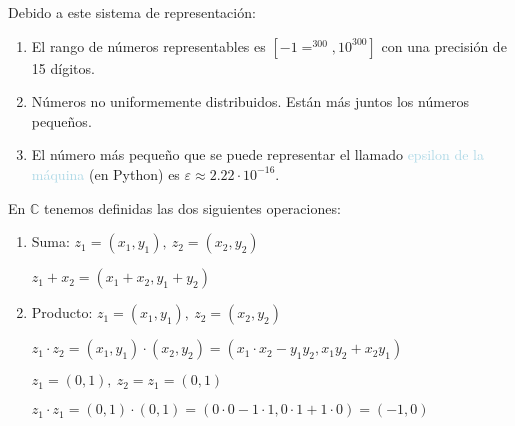 Debido a este sistema de representación:
\begin{enumerate}[label=\color{lightblue}\arabic*)]
	\item El rango de números representables es $[-1=^{300},10^{300}]$ con una precisión de 15 dígitos.
	\item Números no uniformemente distribuidos. Están más juntos los números pequeños.
	\item El número más pequeño que se puede representar el llamado \textcolor{lightblue}{epsilon de la máquina} (en Python) es $\varepsilon\approx2.22\cdot10^{-16}$.
\end{enumerate}
En $\mathbb{C}$ tenemos definidas las dos siguientes operaciones:
\begin{enumerate}[label=\color{lightblue}\alph*)]
	\item Suma: $z_1=(x_1,y_1),~z_2=(x_2,y_2)$
	
	$z_1+x_2=(x_1+x_2,y_1+y_2)$
	\begin{center}
	\end{center}
	\item Producto: $z_1=(x_1,y_1),~z_2=(x_2,y_2)$
	
	$z_1\cdot z_2=(x_1,y_1)\cdot(x_2,y_2)=(x_1\cdot x_2-y_1y_2,x_1y_2+x_2y_1)$
	
	\Ej
	
	$z_1=(0,1),~z_2=z_1=(0,1)$
	
	$z_1\cdot z_1=(0,1)\cdot(0,1)=(0\cdot0-1\cdot1,0\cdot1+1\cdot0)=(-1,0)$
	
	\begin{center}
	\end{center}
\end{enumerate}
